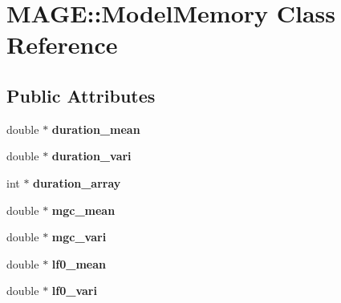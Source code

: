 \hypertarget{class_m_a_g_e_1_1_model_memory}{\section{M\-A\-G\-E\-:\-:Model\-Memory Class Reference}
\label{class_m_a_g_e_1_1_model_memory}
}
\subsection*{Public Attributes}
\begin{DoxyCompactItemize}
\item 
\hypertarget{class_m_a_g_e_1_1_model_memory_acfebd76b2013186c0174a37295c2a4b3}{double $\ast$ {\bfseries duration\-\_\-mean}}\label{class_m_a_g_e_1_1_model_memory_acfebd76b2013186c0174a37295c2a4b3}

\item 
\hypertarget{class_m_a_g_e_1_1_model_memory_a07996f8c357d0e30be9ecaab0beb641e}{double $\ast$ {\bfseries duration\-\_\-vari}}\label{class_m_a_g_e_1_1_model_memory_a07996f8c357d0e30be9ecaab0beb641e}

\item 
\hypertarget{class_m_a_g_e_1_1_model_memory_a64e9f8ae727c1b83ff3f6a044a0684b5}{int $\ast$ {\bfseries duration\-\_\-array}}\label{class_m_a_g_e_1_1_model_memory_a64e9f8ae727c1b83ff3f6a044a0684b5}

\item 
\hypertarget{class_m_a_g_e_1_1_model_memory_a4a0ea059ab8d24374a405e1abeab2904}{double $\ast$ {\bfseries mgc\-\_\-mean}}\label{class_m_a_g_e_1_1_model_memory_a4a0ea059ab8d24374a405e1abeab2904}

\item 
\hypertarget{class_m_a_g_e_1_1_model_memory_ab7320b69a914d63ef1b1db2ea55dbe5b}{double $\ast$ {\bfseries mgc\-\_\-vari}}\label{class_m_a_g_e_1_1_model_memory_ab7320b69a914d63ef1b1db2ea55dbe5b}

\item 
\hypertarget{class_m_a_g_e_1_1_model_memory_a3059f36a01ccbb2d7251f50656a8da44}{double $\ast$ {\bfseries lf0\-\_\-mean}}\label{class_m_a_g_e_1_1_model_memory_a3059f36a01ccbb2d7251f50656a8da44}

\item 
\hypertarget{class_m_a_g_e_1_1_model_memory_a4a0ad4390763808f5145660046ec84db}{double $\ast$ {\bfseries lf0\-\_\-vari}}\label{class_m_a_g_e_1_1_model_memory_a4a0ad4390763808f5145660046ec84db}


\end{DoxyCompactItemize}
